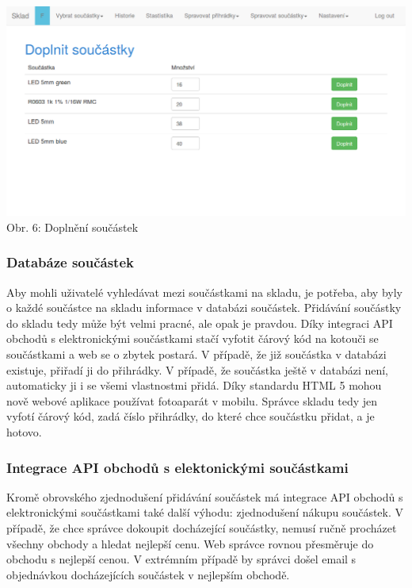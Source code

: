 \documentclass[12pt, a4paper, oneside]{article}
\begin{document}
\begin{minipage}{\textwidth}
\begin{center}
\hspace*{-2cm}
\includegraphics[scale=0.55]{img/web_doplnit_soucastky.png}
\\
\caption{Obr. 6: Doplnění součástek}
\end{center}
\end{minipage}
\vspace{4mm}

\subsubsection{Databáze součástek}

Aby mohli uživatelé vyhledávat mezi součástkami na skladu, je potřeba, aby byly o každé součástce na skladu informace v databázi součástek. Přidávání součástky do skladu tedy může být velmi pracné, ale opak je pravdou. Díky integraci API obchodů s elektronickými součástkami stačí vyfotit čárový kód na kotouči se součástkami a web se o zbytek postará. V případě, že již součástka v databázi existuje, přiřadí ji do přihrádky. V případě, že součástka ještě v databázi není, automaticky ji i se všemi vlastnostmi přidá. Díky standardu HTML 5 mohou nově webové aplikace používat fotoaparát v mobilu. Správce skladu tedy jen vyfotí čárový kód, zadá číslo přihrádky, do které chce součástku přidat, a je hotovo.

\subsubsection{Integrace API obchodů s elektonickými součástkami}

Kromě obrovského zjednodušení přidávání součástek má integrace API obchodů s elektronickými součástkami také další výhodu: zjednodušení nákupu součástek. V případě, že chce správce dokoupit docházející součástky, nemusí ručně procházet všechny obchody a hledat nejlepší cenu. Web správce rovnou přesměruje do obchodu s nejlepší cenou. V extrémním případě by správci došel email s objednávkou docházejících součástek v nejlepším obchodě.
\end{document}
